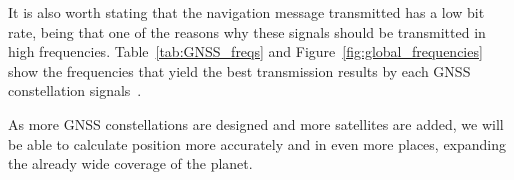 



It is also worth stating that the navigation message transmitted has a low bit rate, being that one of the reasons why these signals should be transmitted in high frequencies. Table~\ref{tab:GNSS_freqs} and Figure~\ref{fig:global_frequencies} show the frequencies that yield the best transmission results by each GNSS constellation signals~\cite{novatel_gnss,kaplan_2017,groves_2008}.

As more GNSS constellations are designed and more satellites are added, we will be able to calculate position more accurately and in even more places, expanding the already wide coverage of the planet.

